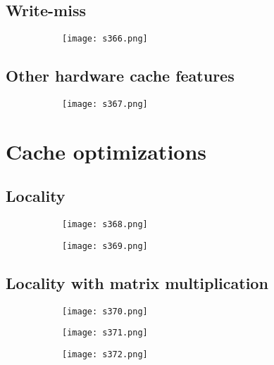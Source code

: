 \documentclass[8pt]{extreport}
\begin{document}
\subsection{Write-miss}
\begin{figure}[H]
\begin{subfigure}[b]{0.4\linewidth}
\texttt{[image: s366.png]}
\end{subfigure}
\end{figure}

\subsection{Other hardware cache features}
\begin{figure}[H]
\begin{subfigure}[b]{0.4\linewidth}
\texttt{[image: s367.png]}
\end{subfigure}
\end{figure}

\section{Cache optimizations}

\subsection{Locality}
\begin{figure}[H]
\begin{subfigure}[b]{0.4\linewidth}
\texttt{[image: s368.png]}
\end{subfigure}
\begin{subfigure}[b]{0.4\linewidth}
\texttt{[image: s369.png]}
\end{subfigure}
\end{figure}
\subsection{Locality with matrix multiplication}
\begin{figure}[H]
\begin{subfigure}[b]{0.4\linewidth}
\texttt{[image: s370.png]}
\end{subfigure}
\begin{subfigure}[b]{0.4\linewidth}
\texttt{[image: s371.png]}
\end{subfigure}
\begin{subfigure}[b]{0.4\linewidth}
\texttt{[image: s372.png]}
\end{subfigure}
\end{figure}
\end{document}
